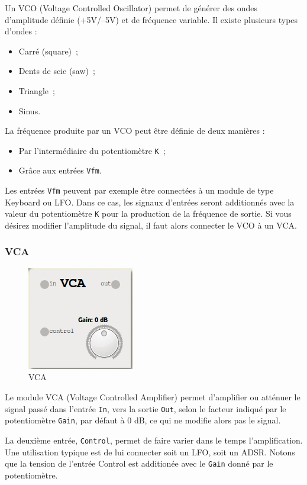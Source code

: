 \documentclass[a4paper,oneside,frenchb,12pt]{article}
\begin{document}
Un VCO (Voltage Controlled Oscillator) permet de générer des ondes
d'amplitude définie (+5V/--5V) et de fréquence variable. Il existe
plusieurs types d'ondes :

\begin{itemize}
\item
  Carré (square)~;
\item
  Dents de scie (saw)~;
\item
  Triangle~;
\item
  Sinus.
\end{itemize}
La fréquence produite par un VCO peut être définie de deux manières :

\begin{itemize}
\item
  Par l'intermédiaire du potentiomètre \verb!K!~;
\item
  Grâce aux entrées \verb!Vfm!.
\end{itemize}
Les entrées \verb!Vfm! peuvent par exemple être connectées à un module
de type Keyboard ou LFO. Dans ce cas, les signaux d'entrées seront
additionnés avec la valeur du potentiomètre \verb!K! pour la production
de la fréquence de sortie. Si vous désirez modifier l'amplitude du
signal, il faut alors connecter le VCO à un VCA.

\subsubsection{VCA}

\begin{figure}[h!]
\centering
\includegraphics[scale=0.5]{../img/png/vca.png}
\caption{VCA}
\end{figure}

Le module VCA (Voltage Controlled Amplifier) permet d'amplifier ou
atténuer le signal passé dans l'entrée \verb!In!, vers la sortie
\verb!Out!, selon le facteur indiqué par le potentiomètre \verb!Gain!,
par défaut à 0 dB, ce qui ne modifie alors pas le signal.

La deuxième entrée, \verb!Control!, permet de faire varier dans le temps
l'amplification. Une utilisation typique est de lui connecter soit un
LFO, soit un ADSR. Notons que la tension de l'entrée Control est
additionée avec le \verb!Gain! donné par le potentiomètre.
\end{document}
